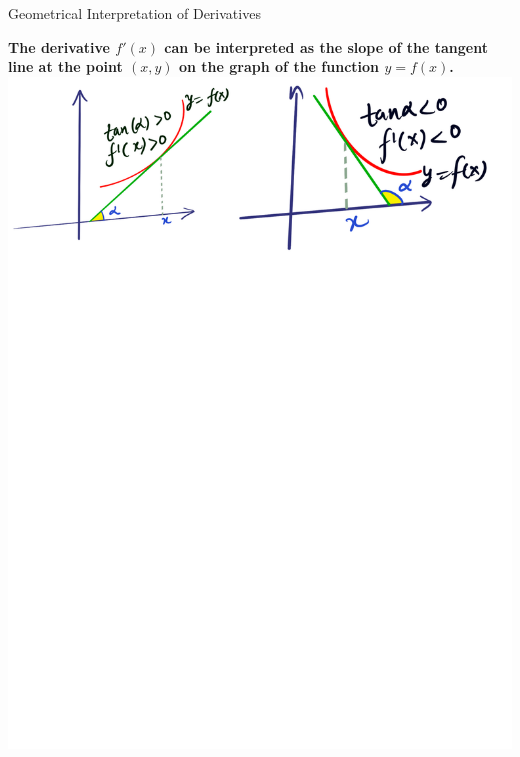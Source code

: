 \documentclass[aspectratio=169,xcolor=dvipsnames,svgnames,x11names,fleqn]{beamer}
\begin{document}
\begin{frame}{Geometrical Interpretation of Derivatives}
\begin{center}
    \bf
    The derivative $f'(x) $ can be interpreted as the slope of the tangent line at the point $(x,y)$ on the graph of the function  $y = f(x)$.
    \includegraphics[width=0.99\linewidth, trim=0cm 40cm 0cm 0cm,clip]{figures/derivative.pdf}
\end{center}
\end{frame}
\end{document}

